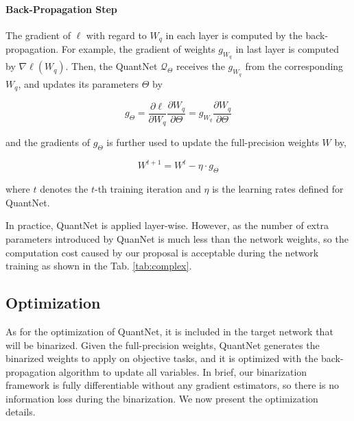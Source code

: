 \documentclass[runningheads]{llncs}
\begin{document}
\paragraph{\textbf{Back-Propagation Step}}
The gradient of $\ell$ with regard to $W_q$ in each layer is computed by the back-propagation.
For example, the gradient of weights $g_{W_q}$ in last layer is computed by $\nabla \ell (W_q)$.
Then, the QuantNet $\mathcal{Q}_{\Theta}$ receives the $g_{W_q}$ from the corresponding $W_q$,
and updates its parameters $\Theta$ by

\begin{equation}\label{eq:update_quantnet}
g_{\Theta} = \frac{\partial \ell}{\partial W_q} \frac{\partial W_q}{\partial \Theta} = g_{W_q} \frac{\partial W_q}{\partial \Theta}
\end{equation}

and the gradients of $g_{\Theta}$ is further used to update the full-precision weights $W$ by,

\begin{equation}\label{eq:update_fp}
W^{t+1} = W^{t} - \eta \cdot g_{\Theta}
\end{equation}

where $t$ denotes the $t$-th training iteration and $\eta$ is the learning rates defined for QuantNet.

In practice, QuantNet is applied layer-wise.
However, as the number of extra parameters introduced by QuanNet is much less than the network weights,
so the computation cost caused by our proposal is acceptable during the network training as shown in the Tab. \ref{tab:complex}.

\subsection{Optimization}
As for the optimization of QuantNet,
it is included in the target network that will be binarized.
Given the full-precision weights, QuantNet generates the binarized weights to apply on objective tasks,
and it is optimized with the back-propagation algorithm to update all variables.
In brief, our binarization framework is fully differentiable without any gradient estimators,
so there is no information loss during the binarization.
We now present the optimization details.
\end{document}
